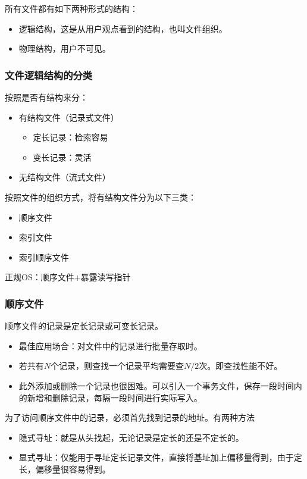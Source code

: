 \documentclass[12pt, a4paper, oneside]{ctexart}
\begin{document}
所有文件都有如下两种形式的结构：
\begin{itemize}
    \item 逻辑结构，这是从用户观点看到的结构，也叫文件组织。
    \item 物理结构，用户不可见。
\end{itemize}

\subsubsection{文件逻辑结构的分类}

按照是否有结构来分：
\begin{itemize}
    \item 有结构文件（记录式文件）
    \begin{itemize}
        \item 定长记录：检索容易
        \item 变长记录：灵活
    \end{itemize}
    \item 无结构文件（流式文件）
\end{itemize}

按照文件的组织方式，将有结构文件分为以下三类：
\begin{itemize}
    \item 顺序文件
    \item 索引文件
    \item 索引顺序文件
\end{itemize}

正规OS：顺序文件+暴露读写指针

\subsubsection{顺序文件}

顺序文件的记录是定长记录或可变长记录。
\begin{itemize}
    \item 最佳应用场合：对文件中的记录进行批量存取时。
    \item 若共有$N$个记录，则查找一个记录平均需要查$N/2$次。即查找性能不好。
    \item 此外添加或删除一个记录也很困难。可以引入一个事务文件，保存一段时间内的新增和删除记录，每隔一段时间进行实际写入。
\end{itemize}

为了访问顺序文件中的记录，必须首先找到记录的地址。有两种方法
\begin{itemize}
    \item 隐式寻址：就是从头找起，无论记录是定长的还是不定长的。
    \item 显式寻址：仅能用于寻址定长记录文件，直接将基址加上偏移量得到，由于定长，偏移量很容易得到。
\end{itemize}
\end{document}

